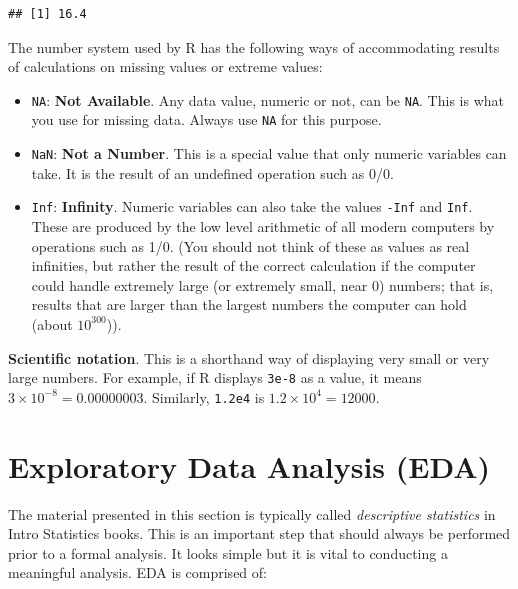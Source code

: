 \documentclass[
]{book}
\begin{document}
\begin{verbatim}
## [1] 16.4
\end{verbatim}

The number system used by R has the following ways of accommodating results of calculations on missing values or extreme values:

\begin{itemize}
\item
  \texttt{NA}: \textbf{Not Available}. Any data value, numeric or not, can be \texttt{NA}. This is what you use for missing data. Always use \texttt{NA} for this purpose.
\item
  \texttt{NaN}: \textbf{Not a Number}. This is a special value that only numeric variables can take. It is the result of an undefined operation such as 0/0.
\item
  \texttt{Inf}: \textbf{Infinity}. Numeric variables can also take the values \texttt{-Inf} and \texttt{Inf}. These are produced by the low level arithmetic of all modern computers by operations such as 1/0. (You should not think of these as values as real infinities, but rather the result of the correct calculation if the computer could handle extremely large (or extremely small, near 0) numbers; that is, results that are larger than the largest numbers the computer can hold (about \(10^{300}\))).
\end{itemize}

\textbf{Scientific notation}. This is a shorthand way of displaying very small or very large numbers. For example, if R displays \texttt{3e-8} as a value, it means \(3\times 10^{-8} = 0.00000003\). Similarly, \texttt{1.2e4} is \(1.2\times 10^4 = 12000\).

\hypertarget{exploratory-data-analysis-eda}{%
\section{Exploratory Data Analysis (EDA)}\label{exploratory-data-analysis-eda}}

The material presented in this section is typically called \emph{descriptive statistics} in Intro Statistics books. This is an important step that should always be performed prior to a formal analysis. It looks simple but it is vital to conducting a meaningful analysis. EDA is comprised of:
\end{document}
